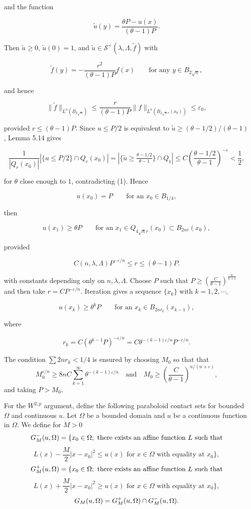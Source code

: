 and the function

\[
\tilde u(y) = \frac{\theta P - u(x)}{(\theta - 1)P}.
\]

Then $\tilde u\ge0$, $\tilde u(0)=1$, and $\tilde u\in\mathcal S^+(\lambda,\Lambda,\tilde f)$ with

\[
\tilde f(y) = -\frac{r^2}{(\theta-1)P}f(x) \qquad \text{for any } y \in B_{2\sqrt{n}},
\]

and hence

\[
\|\tilde f\|_{L^n(B_{2\sqrt{n}})} \le \frac{r}{(\theta-1)P}\|f\|_{L^n(B_{2\sqrt{n}r}(x_0))} \le \varepsilon_0,
\]

provided $r\le(\theta-1)P$. Since $u\le P/2$ is equivalent to $\tilde u\ge(\theta-1/2)/(\theta-1)$, Lemma 5.14 gives

\[
\frac{1}{|Q_r(x_0)|}|\{u \le P/2\}\cap Q_r(x_0)|
= |\{\tilde u \ge \tfrac{\theta - 1/2}{\theta - 1}\}\cap Q_1| \le C\left(\frac{\theta - 1/2}{\theta - 1}\right)^{-\varepsilon} < \frac{1}{2},
\]

for $\theta$ close enough to $1$, contradicting (1). Hence

\[
u(x_0)=P \qquad \text{for an } x_0 \in B_{1/4},
\]

then

\[
u(x_1) \ge \theta P \qquad \text{for an } x_1 \in Q_{4\sqrt{n}r}(x_0) \subset B_{2nr}(x_0),
\]

provided

\[
C(n,\lambda,\Lambda)P^{- \varepsilon/n} \le r \le (\theta - 1)P.
\]

with constants depending only on $n,\lambda,\Lambda$. Choose $P$
such that $P \ge \left(\frac{C}{\theta-1}\right)^{\frac{n}{n+\varepsilon}}$ and then take $r = CP^{-\varepsilon/n}$.
Iteration gives a sequence $\{x_k\}$ with
$k = 1,2,\cdots,$

\[
u(x_k) \ge \theta^k P \qquad \text{for an } x_k \in B_{2nr_k}(x_{k-1}),
\]

where

\[
r_k = C(\theta^{k-1}P)^{-\varepsilon/n} = C\theta^{-(k-1)\varepsilon/n}P^{-\varepsilon/n}.
\]


The condition $\sum2nr_k<1/4$ is ensured by choosing $M_0$ so that
that
\[
M_0^{\varepsilon/n}\ge 8nC\sum_{k=1}^{\infty}\theta^{-(k-1)\varepsilon/n}
\quad\text{and}\quad
M_0\ge \left(\frac{C}{\theta-1}\right)^{\!n/(n+\varepsilon)},
\]
and taking $P>M_0$.

For the $W^{2,p}$ argument, define the following paraboloid contact sets for bounded $\Omega$ and continuous $u$.
Let $\Omega$ be a bounded domain and $u$ be a continuous function in $\Omega$. We define
for $M>0$
\[
\Gm{M}{u,\Omega}=\{x_0\in\Omega;\ \text{there exists an affine function }L\text{ such that}
\]
\[
L(x)-\frac{M}{2}|x-x_0|^2\le u(x)\text{ for }x\in\Omega\text{ with equality at }x_0\},
\]
\[
\Gp{M}{u,\Omega}=\{x_0\in\Omega;\ \text{there exists an affine function }L\text{ such that}
\]
\[
L(x)+\frac{M}{2}|x-x_0|^2\ge u(x)\text{ for }x\in\Omega\text{ with equality at }x_0\},
\]
\[
G_{M}(u,\Omega)=G^+_{M}(u,\Omega)\cap G^-_{M}(u,\Omega).
\]


